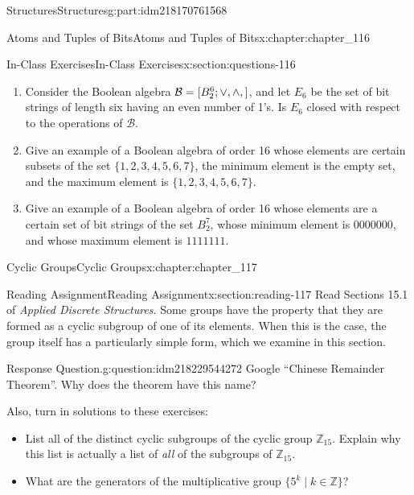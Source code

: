 \documentclass[oneside,10pt,]{book}
\numberwithin{equation}{section}
\begin{document}
\begin{partptx}{Structures}{}{Structures}{}{}{g:part:idm218170761568}
\begin{chapterptx}{Atoms and Tuples of Bits}{}{Atoms and Tuples of Bits}{}{}{x:chapter:chapter_116}
\begin{sectionptx}{In-Class Exercises}{}{In-Class Exercises}{}{}{x:section:questions-116}
\begin{enumerate}[label=\arabic*.]
\begin{enumerate}[label=(\alph*)]
\end{enumerate}
%
\item{}Consider the Boolean algebra \(\mathcal{B} = [B_2^6 ; \lor, \land, \- ]\), and let \(E_6\) be the set of bit strings of length six having an even number of 1's.  Is \(E_6\) closed with respect to the operations of \(\mathcal{B}\).%
\item{}Give an example of a Boolean algebra of order 16 whose elements are certain subsets of the set \(\{1, 2, 3, 4, 5, 6, 7\}\), the minimum element is the empty set, and the maximum element is \(\{1, 2, 3, 4, 5, 6, 7\}\).%
\item{}Give an example of a Boolean algebra of order 16 whose elements are a certain set of bit strings of the set \(B_2^7\), whose minimum element is \(0000000\), and whose maximum element is \(1111111\).%
\end{enumerate}
%
\end{sectionptx}
\end{chapterptx}
%
\typeout{************************************************}
\typeout{************************************************}
%
\begin{chapterptx}{Cyclic Groups}{}{Cyclic Groups}{}{}{x:chapter:chapter_117}
\index{}%
%
%
\typeout{************************************************}
\typeout{************************************************}
%
\begin{sectionptx}{Reading Assignment}{}{Reading Assignment}{}{}{x:section:reading-117}
Read Sections 15.1 of \emph{Applied Discrete Structures}. Some groups have the property that they are formed as a cyclic subgroup of one of its elements.  When this is the case, the group itself has a particularly simple form, which we examine in this section.%
\begin{question}{Response Question.}{g:question:idm218229544272}%
Google ``Chinese Remainder Theorem''. Why does the theorem have this name?%
\end{question}
Also, turn in solutions to these exercises:%
\begin{itemize}[label=\textbullet]
\item{}List all of the distinct cyclic subgroups of the cyclic group \(\mathbb{Z}_{15}\).  Explain why this list is actually a list of \emph{all} of the subgroups of \(\mathbb{Z}_{15}\).%
\item{}What are the generators of the multiplicative group \(\{5^k \mid k\in \mathbb{Z}\}\)?%
\end{itemize}

\end{sectionptx}
\end{chapterptx}
\end{partptx}
\end{document}
